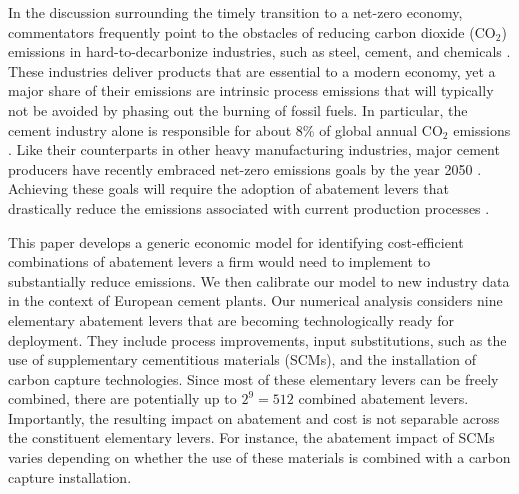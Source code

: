 \documentclass[12pt, a4paper]{article} %
\begin{document}
In the discussion surrounding the timely transition to a net-zero economy, commentators frequently point to the obstacles of reducing carbon dioxide (CO$_2$) emissions in hard-to-decarbonize industries, such as steel, cement, and chemicals \citep{davis2018net,habert2020environmental,ahman2017global}. These industries deliver products that are essential to a modern economy, yet a major share of their emissions are intrinsic process emissions that will typically not be avoided by phasing out the burning of fossil fuels. In particular, the cement industry alone is responsible for about 8\% of global annual CO$_2$ emissions \citep{fennell2021decarbonizing,iea2018technology,cao2020the}. Like their counterparts in other heavy manufacturing industries, major cement producers have recently embraced net-zero emissions goals by the year 2050 \citep{pca2022roadmap,cembureau2020cementing}. Achieving these goals will require the adoption of abatement levers that drastically reduce the emissions associated with current production processes \citep{griffiths2023decarbonizing,clarke2021active,napp2014a,shen2017cement}.

This paper develops a generic economic model for identifying cost-efficient combinations of abatement levers a firm would need to implement to substantially reduce emissions. We then calibrate our model to new industry data \citep{ecra2022state} in the context of European cement plants. Our numerical analysis considers nine elementary abatement levers that are becoming technologically ready for deployment. They include process improvements, input substitutions, such as the use of supplementary cementitious materials (SCMs), and the installation of carbon capture technologies. Since most of these elementary levers can be freely combined, there are potentially up to $2^9=512$ combined abatement levers. Importantly, the resulting impact on abatement and cost is not separable across the constituent elementary levers. For instance, the abatement impact of SCMs varies depending on whether the use of these materials is combined with a carbon capture installation.
\end{document}
